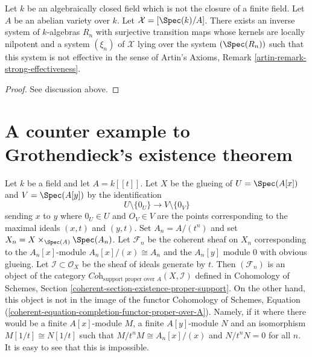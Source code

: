 \begin{lemma}
\label{lemma-non-formal-effectiveness}
Let $k$ be an algebraically closed field which is not the closure
of a finite field. Let $A$ be an abelian variety over $k$.
Let $\mathcal{X} = [\Spec(k)/A]$.
There exists an inverse system of $k$-algebras $R_n$
with surjective transition maps whose kernels are locally nilpotent
and a system $(\xi_n)$ of $\mathcal{X}$ lying over the system
$(\Spec(R_n))$ such that this system is not effective
in the sense of Artin's Axioms, Remark \ref{artin-remark-strong-effectiveness}.
\end{lemma}

\begin{proof}
See discussion above.
\end{proof}








\section{A counter example to Grothendieck's existence theorem}
\label{section-Grothendieck-existence}

\noindent
Let $k$ be a field and let $A = k[[t]]$. Let $X$ be the glueing of
$U = \Spec(A[x])$ and $V = \Spec(A[y])$ by the identification
$$
U \setminus \{0_U\} \longrightarrow V \setminus \{0_V\}
$$
sending $x$ to $y$ where $0_U \in U$ and $O_V \in V$ are the points
corresponding to the maximal ideals $(x, t)$ and $(y, t)$. Set
$A_n = A/(t^n)$ and set $X_n = X \times_{\Spec(A)} \Spec(A_n)$.
Let $\mathcal{F}_n$ be the coherent sheaf on $X_n$
corresponding to the $A_n[x]$-module $A_n[x]/(x) \cong A_n$
and the $A_n[y]$ module $0$ with obvious glueing.
Let $\mathcal{I} \subset \mathcal{O}_X$ be the sheaf of
ideals generate by $t$. Then $(\mathcal{F}_n)$ is an object of
the category $\textit{Coh}_{\text{support proper over } A}(X, \mathcal{I})$
defined in
Cohomology of Schemes, Section \ref{coherent-section-existence-proper-support}.
On the other hand, this object is not in the image of
the functor
Cohomology of Schemes,
Equation (\ref{coherent-equation-completion-functor-proper-over-A}).
Namely, if it where there would be a finite $A[x]$-module $M$,
a finite $A[y]$-module $N$ and an isomorphism $M[1/t] \cong N[1/t]$
such that $M/t^nM \cong A_n[x]/(x)$ and $N/t^nN = 0$ for all $n$.
It is easy to see that this is impossible.

